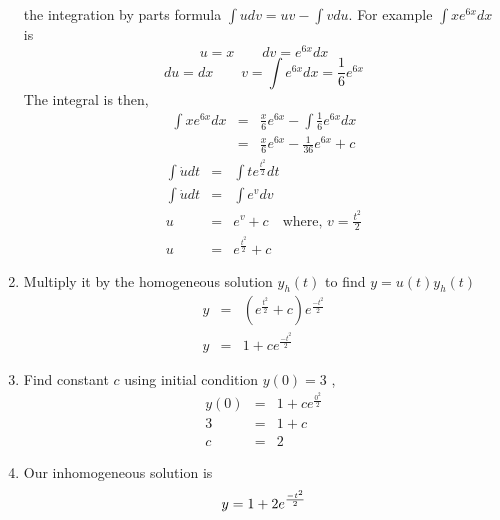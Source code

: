 \begin{enumerate}
{    the integration by parts formula $\int udv = uv - \int vdu$. For example $\int xe^{6x} dx$ is
    \begin{equation*}
      u = x \qquad dv = e^{6x}dx
    \end{equation*}
    \begin{equation*}
      du = dx \qquad v = \int e^{6x} dx  = \frac{1}{6} e^{6x}
    \end{equation*}
    The integral is then,
    \begin{eqnarray*}
      \int xe^{6x}dx &=& \frac{x}{6} e^{6x} - \int \frac{1}{6} e^{6x}dx \\
      &=& \frac{x}{6} e^{6x}  -\frac{1}{36}e^{6x} + c
    \end{eqnarray*}    
  }
  \begin{eqnarray*}
    \int \dot{u} dt &=& \int te^{\frac{t^2}{2}} dt \\
    \int \dot{u} dt &=& \int e^v dv \\
    u &=& e^v + c \quad \text{where, } v = \frac{t^2}{2}\\
    u &=& e^{\frac{t^2}{2}} + c
  \end{eqnarray*}
\item Multiply it by the homogeneous solution $y_h(t)$ to find $y = u(t)y_h(t)$
  \begin{eqnarray*}
    y &=& (e^{\frac{t^2}{2}} + c)e^{\frac{-t^2}{2}}\\
    y &=& 1 + ce^{\frac{-t^2}{2}}
  \end{eqnarray*}
\item Find constant $c$ using initial condition $y(0) = 3$ ,
  \begin{eqnarray*}
    y(0) &=& 1 + ce^{\frac{0^2}{2}}\\
    3 &=& 1 + c \\
    c &=& 2 
  \end{eqnarray*}
\item Our inhomogeneous solution is
  \begin{equation*}
        y = 1 + 2e^{\frac{-t^2}{2}}\\
  \end{equation*}
\end{enumerate}

